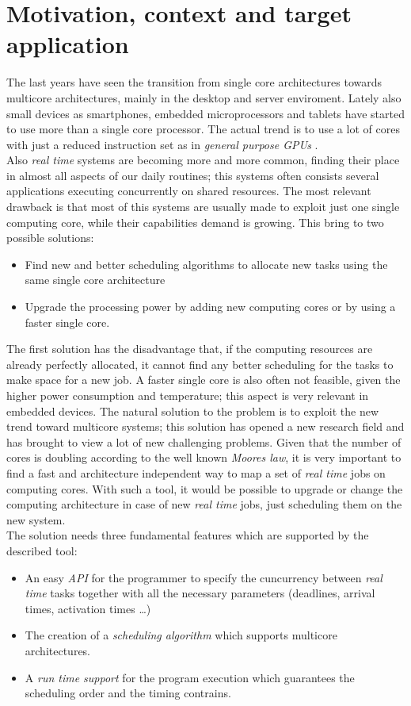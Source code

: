 \documentclass[a4paper,11pt,oneside]{book}
\begin{document}
\section{Motivation, context and target application}
The last years have seen the transition from single core architectures towards multicore architectures, mainly in the desktop and server enviroment. Lately also small devices as smartphones, embedded microprocessors and tablets have started to use more than a single core processor. The actual trend is to use a lot of cores with just a reduced instruction set as in \emph{general purpose GPUs} .\\
Also \emph{real time} systems are becoming more and more common, finding their place in almost all aspects of our daily routines; this systems often consists several applications executing concurrently on shared resources. The most relevant drawback is that most of this systems are usually made to exploit just one single computing core, while their capabilities demand is growing. This bring to two possible solutions:
\begin{itemize}
\item{Find new and better scheduling algorithms to allocate new tasks using the same single core architecture}
\item{Upgrade the processing power by adding new computing cores or by using a faster single core.}
\end{itemize}
The first solution has the disadvantage that, if the computing resources are already perfectly allocated, it cannot find any better scheduling for the tasks to make space for a new job. A faster single core is also often not feasible, given the higher power consumption and temperature; this aspect is very relevant in embedded devices. 
The natural solution to the problem is to exploit the new trend toward multicore systems; this solution has opened a new research field and has brought to view a lot of new challenging problems. Given that the number of cores is doubling according to the well known \emph{Moores law}, it is very important to find a fast and architecture independent way to map a set of \emph{real time} jobs on computing cores. With such a tool, it would be possible to upgrade or change the computing architecture in case of new \emph{real time} jobs, just scheduling them on the new system.\\
 The solution needs three fundamental features which are supported by the described tool:
\begin{itemize}
\item{An easy \emph{API} for the programmer to specify the cuncurrency between \emph{real time} tasks together with all the necessary parameters (deadlines, arrival times, activation times \dots)}
\item{The creation of a \emph{scheduling algorithm} which supports multicore architectures. }
\item{A \emph{run time support} for the program execution which guarantees the scheduling order and the timing contrains.}
\end{itemize}
\end{document}
